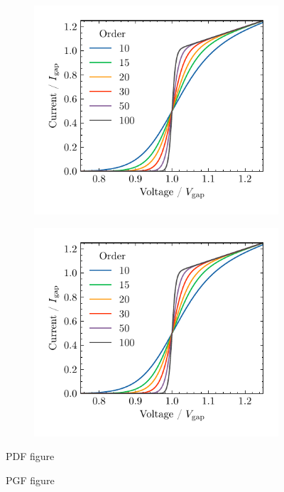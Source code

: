 \documentclass[11pt]{amsart}
\begin{document}
\begin{figure}[h!]
    \centering
    \begin{subfigure}[b]{0.49\textwidth}
    	\centering
        \includegraphics[width=\textwidth]{../figures/fig2.pdf}
        \caption{}
    \end{subfigure}\hfill
%
    \begin{subfigure}[b]{0.49\textwidth}
    	\centering
        \includegraphics[width=\textwidth]{../figures/fig2.pdf}
        \caption{}
    \end{subfigure}
\caption{PDF figure}
\end{figure}

\begin{figure}[h!]
    \centering
    \begin{subfigure}[b]{0.49\textwidth}
    	\centering
        
        \caption{}
    \end{subfigure}\hfill
%
    \begin{subfigure}[b]{0.49\textwidth}
    	\centering
        
        \caption{}
    \end{subfigure}
\caption{PGF figure}
\end{figure}
\end{document}
